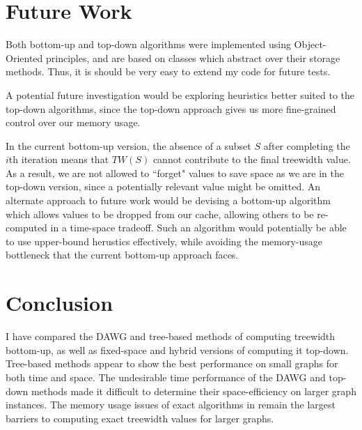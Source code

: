 \documentclass{article}
\begin{document}
\section{Future Work}

Both bottom-up and top-down algorithms were implemented using Object-Oriented principles,
and are based on classes which abstract over their storage methods.
Thus, it is should be very easy to extend my code for future tests.

A potential future investigation would be exploring heuristics better suited
to the top-down algorithms, since the top-down approach gives us more fine-grained control
over our memory usage.

In the current bottom-up version, the absence of a subset $S$ after completing the $i$th iteration
means that $TW(S)$ cannot contribute to the final treewidth value. As a result, we are not allowed to ``forget"
values to save space as we are in the top-down version, since a potentially relevant value might be omitted.
An alternate approach to future work would be devising a bottom-up algorithm which allows
values to be dropped from our cache, allowing others to be re-computed in a time-space tradeoff.
Such an algorithm would potentially be able to use upper-bound herustics effectively, while avoiding
the memory-usage bottleneck that the current bottom-up approach faces.

\section{Conclusion}

I have compared the DAWG and tree-based methods of computing treewidth bottom-up,
as well as fixed-space and hybrid versions of computing it top-down.
Tree-based methods appear to show the best performance on small graphs for both time and space.
The undesirable time performance of the DAWG and top-down methods made it difficult to determine
their space-efficiency on larger graph instances.
The memory usage issues of exact algorithms in \cite{exact} remain the largest barriers to computing
exact treewidth values for larger graphs.




\end{document}
